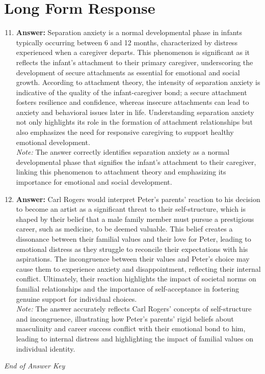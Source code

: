 \documentclass[12pt]{article}
\begin{document}
\section*{Long Form Response}
\begin{enumerate}[label=\arabic*.]
\setcounter{enumi}{10}
\item \textbf{Answer:} Separation anxiety is a normal developmental phase in infants typically occurring between 6 and 12 months, characterized by distress experienced when a caregiver departs. This phenomenon is significant as it reflects the infant's attachment to their primary caregiver, underscoring the development of secure attachments as essential for emotional and social growth. According to attachment theory, the intensity of separation anxiety is indicative of the quality of the infant-caregiver bond; a secure attachment fosters resilience and confidence, whereas insecure attachments can lead to anxiety and behavioral issues later in life. Understanding separation anxiety not only highlights its role in the formation of attachment relationships but also emphasizes the need for responsive caregiving to support healthy emotional development.
\\ \textit{Note:} The answer correctly identifies separation anxiety as a normal developmental phase that signifies the infant's attachment to their caregiver, linking this phenomenon to attachment theory and emphasizing its importance for emotional and social development.
\item \textbf{Answer:} Carl Rogers would interpret Peter's parents' reaction to his decision to become an artist as a significant threat to their self-structure, which is shaped by their belief that a male family member must pursue a prestigious career, such as medicine, to be deemed valuable. This belief creates a dissonance between their familial values and their love for Peter, leading to emotional distress as they struggle to reconcile their expectations with his aspirations. The incongruence between their values and Peter's choice may cause them to experience anxiety and disappointment, reflecting their internal conflict. Ultimately, their reaction highlights the impact of societal norms on familial relationships and the importance of self-acceptance in fostering genuine support for individual choices.
\\ \textit{Note:} The answer accurately reflects Carl Rogers' concepts of self-structure and incongruence, illustrating how Peter's parents' rigid beliefs about masculinity and career success conflict with their emotional bond to him, leading to internal distress and highlighting the impact of familial values on individual identity.
\end{enumerate}

\vfill
\noindent\textit{End of Answer Key}
\end{document}
